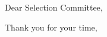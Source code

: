 \documentclass[10pt]{article}
\begin{document}
  \begin{CoverLetter}
Dear \Company{} Selection Committee,\par

\lipsum[1-3]

Thank you for your time,
  \end{CoverLetter}
\end{document}
